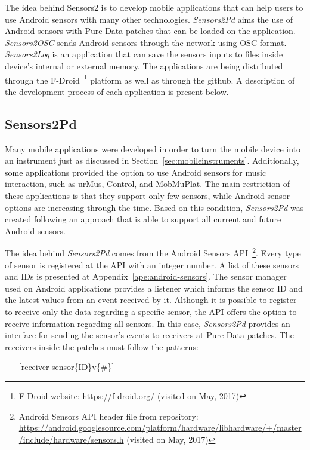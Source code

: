 The idea behind Sensors2 is to develop mobile applications that can help users to use Android sensors with many other technologies.
\textit{Sensors2Pd} aims the use of Android sensors with Pure Data patches that can be loaded on the application.
\textit{Sensors2OSC} sends Android sensors through the network using OSC format.
\textit{Sensors2Log} is an application that can save the sensors inputs to files inside device's internal or external memory.
The applications are being distributed through the F-Droid~\footnote{F-Droid website: \url{https://f-droid.org/} (visited on May, 2017)} platform as well as through the github.
A description of the development process of each application is present below.

\subsection*{Sensors2Pd}
\label{apesubsec:appsensors2pd}

Many mobile applications were developed in order to turn the mobile device into an instrument just as discussed in Section~\ref{sec:mobileinstruments}.
Additionally, some applications provided the option to use Android sensors for music interaction, such as urMus, Control, and MobMuPlat.
The main restriction of these applications is that they support only few sensors, while Android sensor options are increasing through the time.
Based on this condition, \textit{Sensors2Pd} was created following an approach that is able to support all current and future Android sensors.

The idea behind \textit{Sensors2Pd} comes from the Android Sensors API~\footnote{Android Sensors API header file from repository: \url{https://android.googlesource.com/platform/hardware/libhardware/+/master/include/hardware/sensors.h} (visited on May, 2017)}.
Every type of sensor is registered at the API with an integer number.
A list of these sensors and IDs is presented at Appendix~\ref{ape:android-sensors}.
The sensor manager used on Android applications provides a listener which informs the sensor ID and the latest values from an event received by it.
Although it is possible to register to receive only the data regarding a specific sensor, the API offers the option to receive information regarding all sensors.
In this case, \textit{Sensors2Pd} provides an interface for sending the sensor's events to receivers at Pure Data patches.
The receivers inside the patches must follow the patterns:

\begin{itemize}\itemsep0em
	\item[] [receiver sensor\{ID\}v\{\#\}]
\end{itemize}

